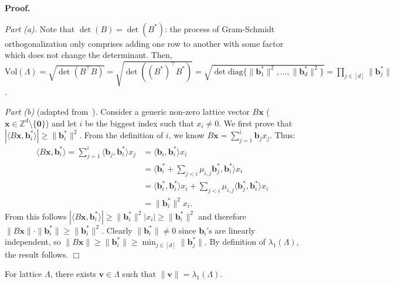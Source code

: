 \documentclass{template}
\newcommand{\qedwhite}{\hfill \ensuremath{\Box}}
\begin{document}
\textbf{Proof.} 

\textit{Part (a).} Note that $\det(B) = \det(B^*)$: the process of Gram-Schmidt
orthogonalization only comprises adding one row to another with some factor
which does not change the determinant. Then, $\text{Vol}(\Lambda) =
\sqrt{\det(B^{\top}B)} = \sqrt{\det((B^*)^{\top}B^*)} = \sqrt{\det
\text{diag}\{\|\mathbf{b}_1^*\|^2, \dots, \|\mathbf{b}_d^*\|^2\}} = \prod_{j \in
[d]}\|\mathbf{b}_j^*\|$.

\textit{Part (b)} (adapted from~\cite{complexity-goldwasser}). Consider a
generic non-zero lattice vector $B\mathbf{x}$ ($\mathbf{x} \in \mathbb{Z}^d
\setminus \{\mathbf{0}\}$) and let $i$ be the biggest index such that $x_i \neq
0$. We first prove that $|\langle B\mathbf{x}, \mathbf{b}_i^* \rangle| \geq
\|\mathbf{b}_i^*\|^2$. From the definition of $i$, we know $B\mathbf{x} =
\sum_{j=1}^i \mathbf{b}_jx_j$. Thus:
\begin{align*}
    \langle B\mathbf{x}, \mathbf{b}_i^* \rangle = \sum_{j=1}^i \langle \mathbf{b}_j, \mathbf{b}_i^*\rangle x_j &= \langle \mathbf{b}_i,\mathbf{b}_i^* \rangle x_i\\
    &= \langle \mathbf{b}_i^* + \sum_{j<i}\mu_{i,j}\mathbf{b}_j^*, \mathbf{b}_i^*\rangle x_i \\
    &= \langle \mathbf{b}_i^*, \mathbf{b}_i^*\rangle x_i + \sum_{j < i}\mu_{i,j}\langle \mathbf{b}_j^*, \mathbf{b}_i^*\rangle x_i \\
    &= \|\mathbf{b}_i^*\|^2x_i.
\end{align*}
From this follows $|\langle B\mathbf{x}, \mathbf{b}_i^* \rangle| \geq
\|\mathbf{b}_i^*\|^2|x_i| \geq \|\mathbf{b}_i^*\|^2$ and therefore
$\|B\mathbf{x}\|\cdot\|\mathbf{b}_i^*\| \geq \|\mathbf{b}_i^*\|^2$. Clearly
$\|\mathbf{b}_i^*\| \neq 0$ since $\mathbf{b}_i$'s are linearly independent, so
$\|B\mathbf{x}\| \geq \|\mathbf{b}_i^*\| \geq \min_{j \in
[d]}\|\mathbf{b}_j^*\|$. By definition of $\lambda_1(\Lambda)$, the result
follows. \qedwhite

\begin{proposition}
    For lattice $\Lambda$, there exists $\mathbf{v} \in \Lambda$ such that
    $\|\mathbf{v}\| = \lambda_1(\Lambda)$.
\end{proposition}
\end{document}
